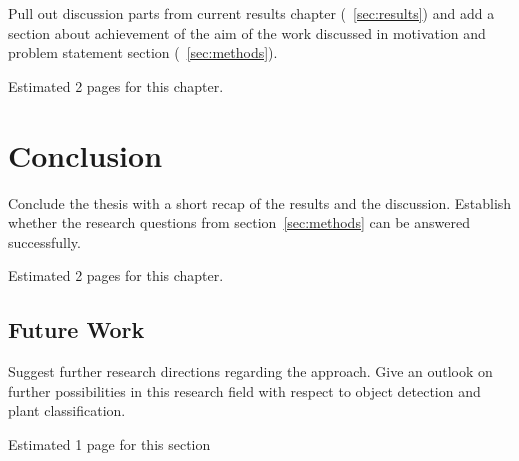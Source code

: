\documentclass[draft,final]{vutinfth} %
\begin{document}
Pull out discussion parts from current results chapter
(~\ref{sec:results}) and add a section about achievement of the aim
of the work discussed in motivation and problem statement section
(~\ref{sec:methods}).

Estimated 2 pages for this chapter.

\chapter{Conclusion}
\label{chap:conclusion}

Conclude the thesis with a short recap of the results and the
discussion. Establish whether the research questions from
section~\ref{sec:methods} can be answered successfully.

Estimated 2 pages for this chapter.

\section{Future Work}
\label{sec:future-work}

Suggest further research directions regarding the approach. Give an
outlook on further possibilities in this research field with respect
to object detection and plant classification.

Estimated 1 page for this section

\backmatter

\listoffigures %

\cleardoublepage %
\listoftables %


\printindex

\printglossaries

%
\printbibliography
\end{document}
